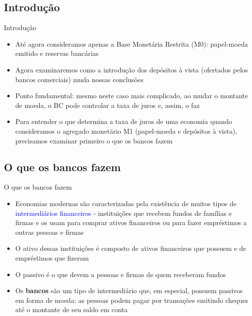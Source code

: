 \documentclass[10pt]{beamer}
\begin{document}
\subsection{Introdução}
\begin{frame}{Introdução}\label{voltar}
    \begin{itemize}
        \item Até agora consideramos apenas a Base Monetária Restrita (M0): papel-moeda emitido e reservas bancárias
        \bigskip        
        \item Agora examinaremos como a introdução dos depósitos à vista (ofertados pelos bancos comerciais) muda nossas conclusões
        \bigskip
        \item Ponto fundamental: mesmo neste caso mais complicado, ao mudar o montante de moeda, o BC pode controlar a taxa de juros e, assim, o faz
        \bigskip
        \item Para entender o que determina a taxa de juros de uma economia quando consideramos o agregado monetário M1 (papel-moeda e depósitos à vista), precisamos examinar primeiro o que os bancos fazem
    \end{itemize}
\end{frame}

\subsection{O que os bancos fazem}
\begin{frame}{O que os bancos fazem}
    \begin{itemize}
        \item Economias modernas são caracterizadas pela existência de muitos tipos de \textcolor{blue}{intermediários financeiros} - instituições que recebem fundos de famílias e firmas e os usam para comprar ativos financeiros ou para fazer empréstimos a outras pessoas e firmas
        \bigskip
        \item O ativo dessas instituições é composto de ativos financeiros que possuem e de empréstimos que fizeram
        \bigskip
        \item O passivo é o que devem a pessoas e firmas de quem receberam fundos
        \bigskip
        \item Os \textbf{bancos} são um tipo de intermediário que, em especial, possuem passivos em forma de moeda: as pessoas podem pagar por transações emitindo cheques até o montante de seu saldo em conta
    \end{itemize}
\end{frame}
\end{document}
